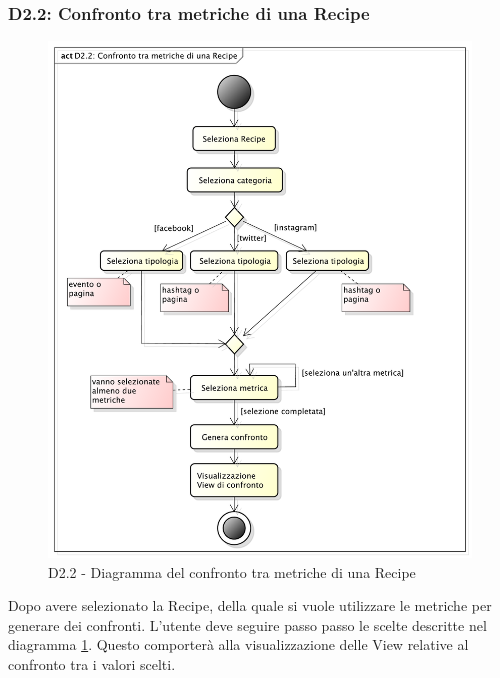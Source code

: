 		\subsubsection{D2.2: Confronto tra metriche di una Recipe} %
		\label{ssub:confronto_tra_metriche_di_una_recipe}
		\begin{figure}[!htbp]
			\centering
			\centerline{\includegraphics[scale=0.45]{./images/D2_2.pdf}}
			\caption{D2.2 - Diagramma del confronto tra metriche di una Recipe}
			\label{fig:d2_2}
		\end{figure}
		\noindent
		Dopo avere selezionato la Recipe, della quale si vuole utilizzare le metriche per generare dei confronti. L'utente deve seguire passo passo le scelte descritte nel diagramma \ref{fig:d2_2}. Questo comporterà alla visualizzazione delle View relative al confronto tra i valori scelti.


